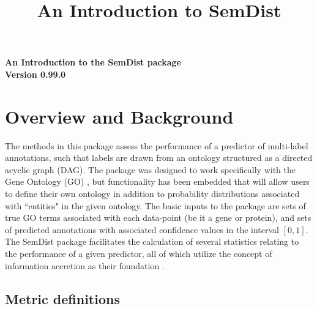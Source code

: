 \documentclass{article}
\title{An Introduction to SemDist}
\begin{document}


\begin{center}

{\Large\bf An Introduction to the SemDist package\\
Version 0.99.0\\
\vspace*{0.5cm}


}

\end{center}

\tableofcontents
\clearpage
\section{Overview and Background}

\hspace{0.5cm} The methods in this package assess the performance of a predictor of multi-label annotations, such that labels are drawn from an ontology structured as a directed acyclic graph (DAG).  The package was designed to work specifically with the Gene Ontology (GO) \citep{Ashburner2000}, but functionality has been embedded that will allow users to define their own ontology in addition to probability distributions associated with ``entities" in the given ontology.  The basic inputs to the package are sets of true GO terms associated with each data-point (be it a gene or protein), and sets of predicted annotations with associated confidence values in the interval $[0,1]$. The SemDist package facilitates the calculation of several statistics relating to the performance of a given predictor, all of which utilize the concept of information accretion as their foundation \citep{Clark2013}.

\subsection{Metric definitions}
\end{document}
